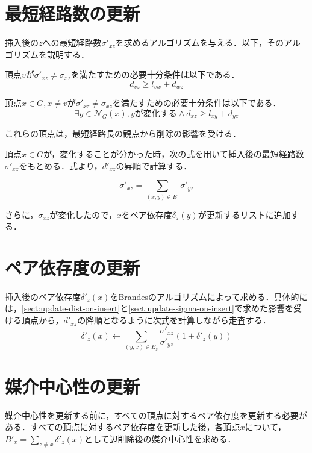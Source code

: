 \section{最短経路数の更新}
\label{sect:update-sigma-on-delete}

挿入後の$z$への最短経路数$\sigma'_{xz}$を求めるアルゴリズムを与える．以下，そのアルゴリズムを説明する．

頂点$v$が$\sigma'_{xz}\neq\sigma_{xz}$を満たすための必要十分条件は以下である．
\begin{equation*}
  d_{vz}\geq l_{vw}+d_{wz}
\end{equation*}

頂点$x\in G,x\neq v$が$\sigma'_{xz}\neq\sigma_{xz}$を満たすための必要十分条件は以下である．
\begin{equation*}
  \exists y\in\mathcal{N}_G(x),yが変化する\land d_{xz}\geq l_{xy}+d_{yz}
\end{equation*}

これらの頂点は，最短経路長の観点から削除の影響を受ける．

頂点$x\in G$が，変化することが分かった時，次の式を用いて挿入後の最短経路数$\sigma'_{xz}$をもとめる．式より，$d'_{xz}$の昇順で計算する．

\begin{equation*}
  \sigma'_{xz}=\sum_{(x,y)\in E'}\sigma'_{yz}
\end{equation*}

さらに，$\sigma_{xz}$が変化したので，$x$をペア依存度$\delta_z(y)$が更新するリストに追加する．

\section{ペア依存度の更新}
\label{sect:update-delta-on-delete}

挿入後のペア依存度$\delta'_z(x)$をBrandesのアルゴリズムによって求める．具体的には，\ref{sect:update-dist-on-insert}と\ref{sect:update-sigma-on-insert}で求めた影響を受ける頂点から，$d'_{xz}$の降順となるように次式を計算しながら走査する．
\[ \delta'_{z}(x)\gets\sum_{(y,x)\in E_z}\frac{\sigma'_{xz}}{\sigma'_{yz}}(1+\delta'_z(y)) \]

\section{媒介中心性の更新}
媒介中心性を更新する前に，すべての頂点に対するペア依存度を更新する必要がある．すべての頂点に対するペア依存度を更新した後，各頂点$x$について，$B'_x=\sum_{z\neq x}\delta'_{z}(x)$として辺削除後の媒介中心性を求める．

